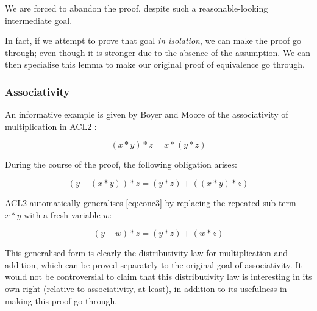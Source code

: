 \documentclass[]{article}
\begin{document}
We are forced to abandon the proof, despite such a reasonable-looking intermediate goal.

In fact, if we attempt to prove that goal \emph{in isolation}, we can make the proof go through; even though it is stronger due to the absence of the  assumption. We can then specialise this lemma to make our original proof of equivalence go through.

\iffalse

\begin{lstlisting}[language=ML, xleftmargin=.2\textwidth, xrightmargin=.2\textwidth]
Lemma gen n m : plus (S n) m = plus n (S m).
  induction n; triv. (* Base case is trivial *)

  (* Move all S constructors outside *)
  simpl. rewrite <- IHn. simpl.

  (* Trivial *)
  reflexivity.
Defined.
\end{lstlisting}

\begin{lstlisting}[language=ML, xleftmargin=.2\textwidth, xrightmargin=.2\textwidth]
  rewrite (gen n m).
  reflexivity.
Defined.
\end{lstlisting}

\fi

\subsubsection{Associativity}

An informative example is given by Boyer and Moore of the associativity of multiplication in ACL2 \cite{boyer1983proof}:

$$(x * y) * z = x * (y * z)$$

During the course of the proof, the following obligation arises:

\begin{equation}
  \tag{conc3}
  (y + (x * y)) * z = (y * z) + ((x * y) * z)
  \label{eq:conc3}
\end{equation}

ACL2 automatically generalises \eqref{eq:conc3} by replacing the repeated sub-term $x * y$ with a fresh variable $w$:

\begin{equation}
  \tag{conc4}
  (y + w) * z = (y * z) + (w * z)
  \label{eq:conc4}
\end{equation}

This generalised form is clearly the distributivity law for multiplication and addition, which can be proved separately to the original goal of associativity. It would not be controversial to claim that this distributivity law is interesting in its own right (relative to associativity, at least), in addition to its usefulness in making this proof go through.
\end{document}
